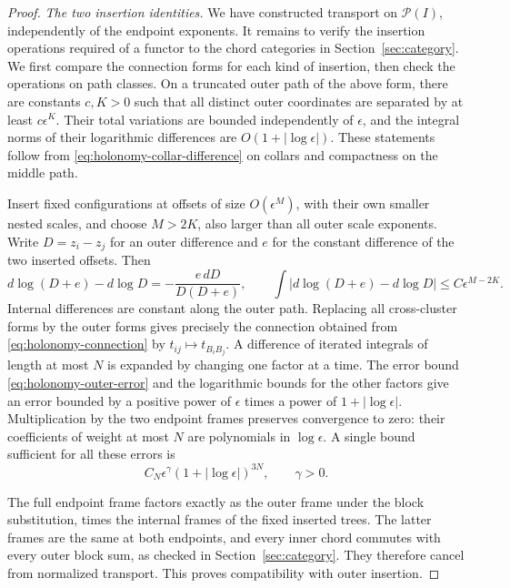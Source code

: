 \begin{proof}
\emph{The two insertion identities.}
We have constructed transport on $\mathcal P(I)$, independently of
the endpoint exponents.  It remains to verify the insertion operations
required of a functor to the chord categories in
Section~\ref{sec:category}.  We first compare the connection forms for
each kind of insertion, then check the operations on path classes.
On a truncated
outer path of the above form, there are constants $c,K>0$ such that
all distinct outer coordinates are separated by at least
$c\epsilon^K$.  Their total variations are bounded independently of
$\epsilon$, and the integral norms of their logarithmic differences
are $O(1+|\log\epsilon|)$.  These statements follow from
\eqref{eq:holonomy-collar-difference} on collars and compactness on
the middle path.

Insert fixed configurations at offsets of size $O(\epsilon^M)$,
with their own smaller nested scales, and choose $M>2K$, also larger
than all outer scale exponents.  Write $D=z_i-z_j$ for an outer
difference and $e$ for the constant difference of the two inserted
offsets.  Then
\begin{equation}\label{eq:holonomy-outer-error}
 d\log(D+e)-d\log D
 =-\frac{e\,dD}{D(D+e)},
 \qquad
 \int\left|d\log(D+e)-d\log D\right|
 \leq C\epsilon^{M-2K}.
\end{equation}
Internal differences are constant along the outer path.  Replacing
all cross-cluster forms by the outer forms gives precisely the
connection obtained from \eqref{eq:holonomy-connection} by
$t_{ij}\mapsto t_{B_iB_j}$.  A difference of iterated integrals of
length at most $N$ is expanded by changing one factor at a time.
The error bound \eqref{eq:holonomy-outer-error} and the logarithmic
bounds for the other factors give an error bounded by a positive
power of $\epsilon$ times a power of $1+|\log\epsilon|$.
Multiplication by the two endpoint frames preserves convergence to
zero: their coefficients of weight at most $N$ are polynomials in
$\log\epsilon$.  A single bound sufficient for all these errors is
\begin{equation}\label{eq:holonomy-insertion-bound}
 C_N\epsilon^\gamma(1+|\log\epsilon|)^{3N},\qquad \gamma>0.
\end{equation}

The full endpoint frame factors exactly as the outer frame under the
block substitution, times the internal frames of the fixed inserted
trees.  The latter frames are the same at both endpoints, and every
inner chord commutes with every outer block sum, as checked in
Section~\ref{sec:category}.  They therefore cancel from normalized
transport.  This proves compatibility with outer insertion.


\end{proof}
